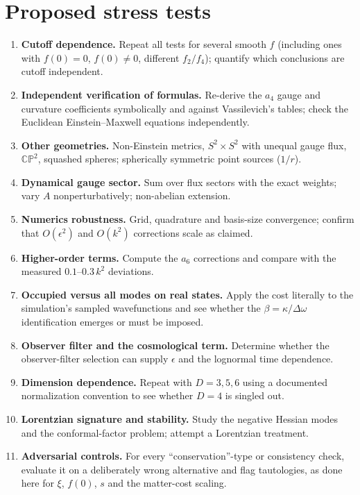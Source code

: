 \documentclass[11pt]{article}
\begin{document}
\section{Proposed stress tests}
\label{sec:stress}
\begin{enumerate}
\item \textbf{Cutoff dependence.} Repeat all tests for several smooth $f$ (including ones with $f(0)=0$, $f(0)\neq0$, different $f_2/f_4$); quantify which conclusions are cutoff independent.
\item \textbf{Independent verification of formulas.} Re-derive the $a_4$ gauge and curvature coefficients symbolically and against Vassilevich's tables; check the Euclidean Einstein--Maxwell equations independently.
\item \textbf{Other geometries.} Non-Einstein metrics, $S^2\times S^2$ with unequal gauge flux, $\mathbb{CP}^2$, squashed spheres; spherically symmetric point sources ($1/r$).
\item \textbf{Dynamical gauge sector.} Sum over flux sectors with the exact weights; vary $A$ nonperturbatively; non-abelian extension.
\item \textbf{Numerics robustness.} Grid, quadrature and basis-size convergence; confirm that $O(\epsilon^2)$ and $O(k^2)$ corrections scale as claimed.
\item \textbf{Higher-order terms.} Compute the $a_6$ corrections and compare with the measured $0.1$--$0.3\,k^2$ deviations.
\item \textbf{Occupied versus all modes on real states.} Apply the cost literally to the simulation's sampled wavefunctions and see whether the $\beta=\kappa/\Delta\omega$ identification emerges or must be imposed.
\item \textbf{Observer filter and the cosmological term.} Determine whether the observer-filter selection can supply $\epsilon$ and the lognormal time dependence.
\item \textbf{Dimension dependence.} Repeat with $D=3,5,6$ using a documented normalization convention to see whether $D=4$ is singled out.
\item \textbf{Lorentzian signature and stability.} Study the negative Hessian modes and the conformal-factor problem; attempt a Lorentzian treatment.
\item \textbf{Adversarial controls.} For every ``conservation''-type or consistency check, evaluate it on a deliberately wrong alternative and flag tautologies, as done here for $\xi$, $f(0)$, $s$ and the matter-cost scaling.
\end{enumerate}
\end{document}
